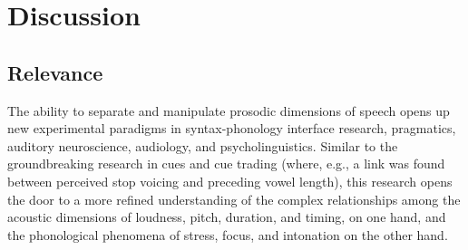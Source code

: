 \chapter{Discussion}

\section{Relevance}
The ability to separate and manipulate prosodic dimensions of speech opens up new experimental paradigms in syntax-phonology interface research, pragmatics, auditory neuroscience, audiology, and psycholinguistics.  Similar to the groundbreaking research in cues and cue trading (where, e.g., a link was found between perceived stop voicing and preceding vowel length), this research opens the door to a more refined understanding of the complex relationships among the acoustic dimensions of loudness, pitch, duration, and timing, on one hand, and the phonological phenomena of stress, focus, and intonation on the other hand.


